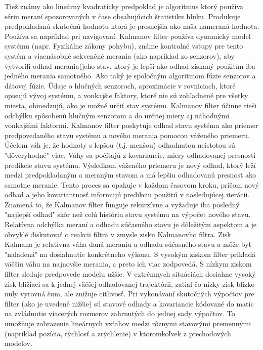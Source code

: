 Tiež známy ako lineárny kvadraticky predpoklad je algoritmus ktorý používa sériu meraní
spozorovaných v čase obsahujúcich štatistiku hluku. Produkuje predpokladanú skutočnú
hodnotu ktorá je presnejšia ako naša nameraná hodnota.
Používa sa napríklad pri navigovaní.
Kalmanov filter používa dynamický model systému (napr. Fyzikálne zákony pohybu), známe
kontrolné vstupy pre tento systém a viacnásobné sekvenčné merania (ako napríklad zo
senzorov), aby vytvorili odhad merania(jeho stav, ktorý je lepší ako odhad získaný použitím
iba jedného merania samotného. Ako taký je spoločným algoritmom fúzie senzorov a dátovej
fúzie. Údaje o hlučných senzoroch, aproximácie v rovniciach, ktoré opisujú vývoj systému, a
vonkajšie faktory, ktoré nie sú zohľadnené pre všetky miesta, obmedzujú, ako je možné určiť
stav systému. Kalmanov filter účinne rieši odchýlku spôsobenú hlučným senzorom a do
určitej miery aj náhodnými vonkajšími faktormi. Kalmanov filter poskytuje odhad stavu
systému ako priemer predpovedaného stavu systému a nového merania pomocou váženého
priemeru. Účelom váh je, že hodnoty s lepšou (t.j. menšou) odhadnutou neistotou sú
"dôveryhodné" viac. Váhy sa počítajú z kovariancie, miery odhadovanej presnosti predikcie
stavu systému. Výsledkom váženého priemeru je nový odhad, ktorý leží medzi
predpokladaným a meraným stavom a má lepšiu odhadovanú presnosť ako samotne meranie.
Tento proces sa opakuje v každom časovom kroku, pričom nový odhad a jeho kovariantnosť
informujú predikciu použitú v nasledujúcej iterácii. Znamená to, že Kalmanov filter funguje
rekurzívne a vyžaduje iba posledný "najlepší odhad" skôr než celú históriu stavu systému na
výpočet nového stavu. Relatívna odchýlka meraní a odhadu súčasného stavu je dôležitým
aspektom a je obvyklé diskutovať o reakcii filtra v zmysle zisku Kalmanovho filtra. Zisk
Kalmana je relatívna váha daná meraniu a odhadu súčasného stavu a môže byť "naladená" na
dosiahnutie konkrétneho výkonu. S vysokým ziskom filter prikladá väčšiu váhu na najnovšie
merania, a preto ich viac zodpovedá. S nízkym ziskom filter sleduje predpovede modelu
užšie. V extrémnych situáciách dosiahne vysoký zisk blížiaci sa k jednej väčšej odhadovanej
trajektórii, zatiaľ čo nízky zisk blízko nuly vyrovná šum, ale znižuje citlivosť. Pri vykonávaní
skutočných výpočtov pre filter (ako je uvedené nižšie) sú stavové odhady a kovariancie
kódované do matíc na zvládnutie viacerých rozmerov zahrnutých do jednej sady výpočtov.
To umožňuje zobrazenie lineárnych vzťahov medzi rôznymi stavovými premennými
(napríklad pozícia, rýchlosť a zrýchlenie) v ktoromkoľvek z prechodových modelov.

